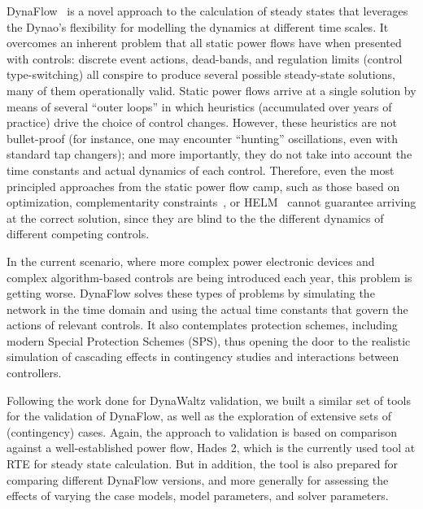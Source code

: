 \documentclass[conference]{IEEEtran}
\newcommand{\Dynawo}{Dyna\textomega o\xspace} %
\begin{document}
DynaFlow~\cite{Cossart21} is a novel approach to the calculation of steady states
that leverages the \Dynawo's flexibility for modelling the dynamics at different
time scales. It overcomes an inherent problem that all static power flows have
when presented with controls: discrete event actions, dead-bands, and regulation
limits (control type-switching) all conspire to produce several possible
steady-state solutions, many of them operationally valid.  Static power flows
arrive at a single solution by means of several ``outer loops'' in which
heuristics (accumulated over years of practice) drive the choice of control
changes. However, these heuristics are not bullet-proof (for instance, one may
encounter ``hunting'' oscillations, even with standard tap changers); and more
importantly, they do not take into account the time constants and actual
dynamics of each control. Therefore, even the most principled approaches from the
static power flow camp, such as those based on optimization\cite{Ju20},
complementarity constraints~\cite{Murray15}, or HELM~\cite{Trias18} cannot
guarantee arriving at the correct solution, since they are blind to the the
different dynamics of different competing controls.

In the current scenario, where more complex power electronic devices
and complex algorithm-based controls are being introduced each year,
this problem is getting worse. DynaFlow solves these types of problems
by simulating the network in the time domain and using the actual time
constants that govern the actions of relevant controls. It also
contemplates protection schemes, including modern Special Protection
Schemes (SPS), thus opening the door to the realistic simulation of
cascading effects in contingency studies and interactions between
controllers.

Following the work done for DynaWaltz validation, we built a similar
set of tools for the validation of DynaFlow, as well as the
exploration of extensive sets of (contingency) cases.  Again, the
approach to validation is based on comparison against a
well-established power flow, Hades 2, which is the currently used tool
at RTE for steady state calculation. But in addition, the tool is also
prepared for comparing different DynaFlow versions, and more
generally for assessing the effects of varying the case models, model
parameters, and solver parameters.


\end{document}
